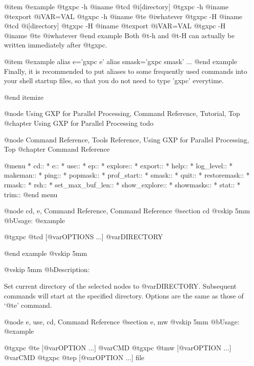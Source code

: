 @item 
@example
@t{gxpc -h} @i{name} @t{cd} @i{[directory]}
@t{gxpc -h} @i{name} @t{export} @i{VAR=VAL}
@t{gxpc -h} @i{name} @t{e} @i{whatever}
@t{gxpc -H} @i{name} @t{cd} @i{[directory]}
@t{gxpc -H} @i{name} @t{export} @i{VAR=VAL}
@t{gxpc -H} @i{name} @t{e} @i{whatever}
@end example
Both @t{-h} and @t{-H} can actually be written immediately after @t{gxpc}.

@item
@example
alias e='gxpc e'
alias smask='gxpc smask'
...
@end example
Finally, it is recommended to put aliases to some frequently used
commands into your shell startup files, so that you do not need to
type 'gxpc' everytime.


@end itemize




@node Using GXP for Parallel Processing, Command Reference, Tutorial, Top
@chapter Using GXP for Parallel Processing
todo

@node Command Reference, Tools Reference, Using GXP for Parallel Processing, Top
@chapter Command Reference

@menu
* cd::                          
* e::                           
* use::                         
* ep::                          
* explore::                     
* export::                      
* help::                        
* log_level::                   
* makeman::                     
* ping::                        
* popmask::                     
* prof_start::                  
* smask::                       
* quit::                        
* restoremask::                 
* rmask::                       
* rsh::                         
* set_max_buf_len::             
* show_explore::                
* showmasks::                   
* stat::                        
* trim::                        
@end menu

@node cd, e, Command Reference, Command Reference
@section cd
@vskip 5mm
@b{Usage:}
@example

  @t{gxpc} @t{cd} [@var{OPTIONS} ...] @var{DIRECTORY}

@end example
@vskip 5mm

@vskip 5mm
@b{Description:}


  Set current directory of the selected nodes to @var{DIRECTORY}.
Subsequent commands will start at the specified directory.
Options are the same as those of `@t{e}' command.


@node e, use, cd, Command Reference
@section e, mw
@vskip 5mm
@b{Usage:}
@example

  @t{gxpc} @t{e}  [@var{OPTION} ...] @var{CMD}
  @t{gxpc} @t{mw} [@var{OPTION} ...] @var{CMD}
  @t{gxpc} @t{ep} [@var{OPTION} ...] file

